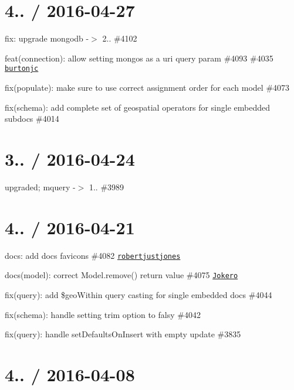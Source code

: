 \section*{4.. / 2016-\/04-\/27 }


\begin{DoxyItemize}
\item fix\+: upgrade mongodb -\/$>$ 2.. \#4102
\item feat(connection)\+: allow setting mongos as a uri query param \#4093 \#4035 \href{https://github.com/burtonjc}{\tt burtonjc}
\item fix(populate)\+: make sure to use correct assignment order for each model \#4073
\item fix(schema)\+: add complete set of geospatial operators for single embedded subdocs \#4014
\end{DoxyItemize}

\section*{3.. / 2016-\/04-\/24 }


\begin{DoxyItemize}
\item upgraded; mquery -\/$>$ 1.. \#3989
\end{DoxyItemize}

\section*{4.. / 2016-\/04-\/21 }


\begin{DoxyItemize}
\item docs\+: add docs favicons \#4082 \href{https://github.com/robertjustjones}{\tt robertjustjones}
\item docs(model)\+: correct Model.\+remove() return value \#4075 \href{https://github.com/Jokero}{\tt Jokero}
\item fix(query)\+: add \$geo\+Within query casting for single embedded docs \#4044
\item fix(schema)\+: handle setting trim option to falsy \#4042
\item fix(query)\+: handle set\+Defaults\+On\+Insert with empty update \#3835
\end{DoxyItemize}

\section*{4.. / 2016-\/04-\/08 }


